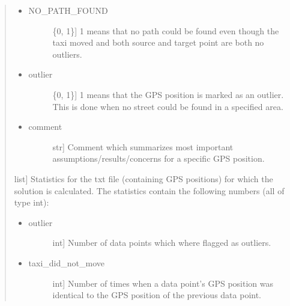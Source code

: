 \documentclass[letterpaper,10pt,english]{sphinxmanual}
\begin{document}
\begin{fulllineitems}
\begin{quote}
\begin{description}
\begin{description}
\begin{itemize}
\begin{description}
\end{description}

\item {} \begin{description}
\item[{NO\_PATH\_FOUND}] \leavevmode{[}\{0, 1\}{]}
1 means that no path could be found even though the taxi moved and both source and target point are both no outliers.

\end{description}

\item {} \begin{description}
\item[{outlier}] \leavevmode{[}\{0, 1\}{]}
1 means that the GPS position is marked as an outlier. This is done when no street could be found in a specified area.

\end{description}

\item {} \begin{description}
\item[{comment}] \leavevmode{[}str{]}
Comment which summarizes most important assumptions/results/concerns for a specific GPS position.

\end{description}

\end{itemize}

\item[{\sphinxstylestrong{statistics}}] \leavevmode{[}list{]}
Statistics for the txt file (containing GPS positions) for which the solution is calculated.
The statistics contain the following numbers (all of type int):
\begin{itemize}
\item {} \begin{description}
\item[{outlier}] \leavevmode{[}int{]}
Number of data points which where flagged as outliers.

\end{description}

\item {} \begin{description}
\item[{taxi\_did\_not\_move}] \leavevmode{[}int{]}
Number of times when a data point’s GPS position was identical to the GPS position of the previous data point.

\end{description}


\end{itemize}
\end{description}
\end{description}
\end{quote}
\end{fulllineitems}
\end{document}
